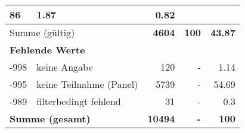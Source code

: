 \begin{longtable}{lXrrr}
       \num{86} &
       \num[round-mode=places,round-precision=2]{1,87} &
         \num[round-mode=places,round-precision=2]{0,82} \\
     \midrule
     \multicolumn{2}{l}{Summe (gültig)} &
       \textbf{\num{4604}} &
     \textbf{100} &
       \textbf{\num[round-mode=places,round-precision=2]{43,87}} \\
     \multicolumn{5}{l}{\textbf{Fehlende Werte}}\\
       -998 &
       keine Angabe &
         \num{120} &
        - &
         \num[round-mode=places,round-precision=2]{1,14} \\
       -995 &
       keine Teilnahme (Panel) &
         \num{5739} &
        - &
         \num[round-mode=places,round-precision=2]{54,69} \\
       -989 &
       filterbedingt fehlend &
         \num{31} &
        - &
         \num[round-mode=places,round-precision=2]{0,3} \\
     \midrule
     \multicolumn{2}{l}{\textbf{Summe (gesamt)}} &
          \textbf{\num{10494}} &
        \textbf{-} &
        \textbf{100} \\
     \bottomrule
     \end{longtable}
     
